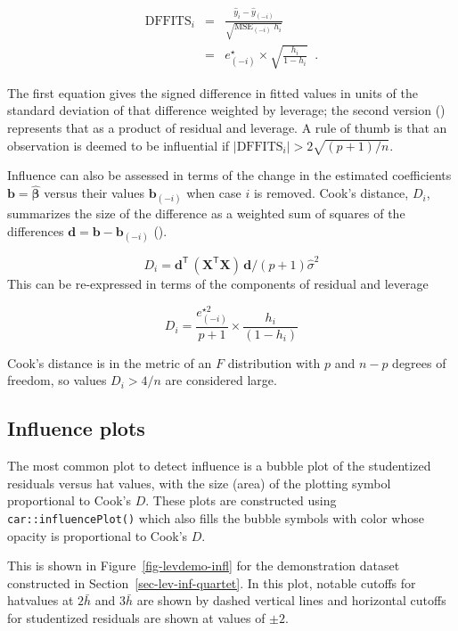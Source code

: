 \documentclass[
  letterpaper,
  10pt,
  krantz2]{krantz}
\begin{document}
\begin{eqnarray*}
\text{DFFITS}_i & = & \frac{\hat{y}_i - \hat{y}_{(-i)}}{\sqrt{\text{MSE}_{(-i)}\; h_i}} \\
   & = & e^\star_{(-i)} \times \sqrt{\frac{h_i}{1-h_i}} \;\; .
\end{eqnarray*}

The first equation gives the signed difference in fitted values in units
of the standard deviation of that difference weighted by leverage; the
second version ()
represents that as a product of residual and leverage. A rule of thumb
is that an observation is deemed to be influential if
\(| \text{DFFITS}_i | > 2 \sqrt{(p+1) / n}\).

Influence can also be assessed in terms of the change in the estimated
coefficients \(\mathbf{b} = \widehat{\mathbf{\beta}}\) versus their
values \(\mathbf{b}_{(-i)}\) when case \(i\) is removed. Cook's
distance, \(D_i\), summarizes the size of the difference as a weighted
sum of squares of the differences
\(\mathbf{d} =\mathbf{b} - \mathbf{b}_{(-i)}\)
().

\[
D_i = \mathbf{d}^\mathsf{T}\, (\mathbf{X}^\mathsf{T}\mathbf{X}) \,\mathbf{d} / (p+1) \hat{\sigma}^2
\] This can be re-expressed in terms of the components of residual and
leverage

\[
D_i = \frac{e^{\star 2}_{(-i)}}{p+1} \times \frac{h_i}{(1- h_i)}
\]

Cook's distance is in the metric of an \(F\) distribution with \(p\) and
\(n − p\) degrees of freedom, so values \(D_i > 4/n\) are considered
large.

\subsection{Influence plots}\label{influence-plots}

The most common plot to detect influence is a bubble plot of the
studentized residuals versus hat values, with the size (area) of the
plotting symbol proportional to Cook's \(D\). These plots are
constructed using \texttt{car::influencePlot()} which also fills the
bubble symbols with color whose opacity is proportional to Cook's \(D\).

This is shown in Figure~\ref{fig-levdemo-infl} for the demonstration
dataset constructed in Section~\ref{sec-lev-inf-quartet}. In this plot,
notable cutoffs for hatvalues at \(2 \bar{h}\) and \(3 \bar{h}\) are
shown by dashed vertical lines and horizontal cutoffs for studentized
residuals are shown at values of \(\pm 2\).
\end{document}
